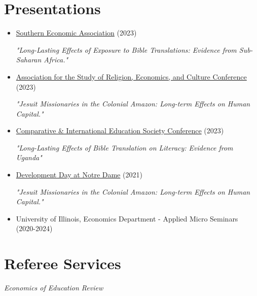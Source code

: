 \documentclass[letterpaper,11pt]{article}
\begin{document}
\section{Presentations}
\begin{adjustwidth}{3mm}{0mm}
  \begin{itemize}
    \item \href{https://www.southerneconomic.org/event/7662b305-ad92-474d-8f2c-bce1240b9858/websitePage:e0a9d079-18e0-4413-a0b6-32f8f6b51e64}{Southern Economic Association} (2023) 
    
    \textit{"Long-Lasting Effects of Exposure to Bible Translations: Evidence from Sub-Saharan Africa."}
  \end{itemize}

  \begin{itemize}
    \item \href{http://www.asrec.org/conferences/}{Association for the Study of Religion, Economics, and Culture Conference} (2023) 
    
    \textit{"Jesuit Missionaries in the Colonial Amazon: Long-term Effects on Human Capital."}
  \end{itemize}

  \begin{itemize}
    \item \href{https://cies2023.org/}{Comparative \& International Education Society Conference} (2023) 
    
    \textit{"Long-Lasting Effects of Bible Translation on Literacy: Evidence from Uganda"}
  \end{itemize}

  \begin{itemize}
    \item \href{https://kellogg.nd.edu/development-day-2021#tab-2998}{Development Day at Notre Dame} (2021) 
    
    \textit{"Jesuit Missionaries in the Colonial Amazon: Long-term Effects on Human Capital."}
  \end{itemize}

  \begin{itemize}
    \item University of Illinois, Economics Department - Applied Micro Seminars (2020-2024)
  \end{itemize}
\end{adjustwidth}

\section{Referee Services}
\begin{adjustwidth}{3mm}{0mm}
\textit{Economics of Education Review}
\end{adjustwidth}
\end{document}
